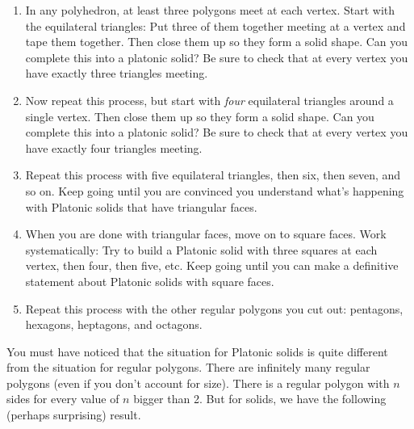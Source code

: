 \begin{enumerate}
\item
In any polyhedron, at least three polygons meet at each vertex.  Start with the equilateral triangles: Put three of them together meeting at a vertex and tape them together.  Then close them up so they form a solid shape.  Can you complete this into a platonic solid?  Be sure to check that at every vertex you have exactly three triangles meeting.\\


\item
Now repeat this process, but start with \emph{four} equilateral triangles around a single vertex.  Then close them up so they form a solid shape.  Can you complete this into a platonic solid?  Be sure to check that at every vertex you have exactly four triangles meeting.\\



\item
Repeat this process with five equilateral triangles, then six, then seven, and so on.  Keep going until you are convinced you understand what's happening with Platonic solids that have triangular faces.\\

\item
When you are done with triangular faces, move on to square faces. Work systematically: Try  to build a Platonic solid with three squares at each vertex, then four, then five, etc.  Keep going until you can make a definitive statement about Platonic solids with square faces.\\

\item
Repeat this process with the other regular polygons you cut out: pentagons, hexagons, heptagons, and octagons.  
\end{enumerate}

\bigskip
\bigskip


You must have noticed that the situation for Platonic solids is quite different from the situation for regular polygons.  There are infinitely many regular polygons (even if you don't account for size).  There is a regular polygon with $n$ sides for every value of $n$ bigger than 2.  But for solids, we have the following (perhaps surprising) result.

